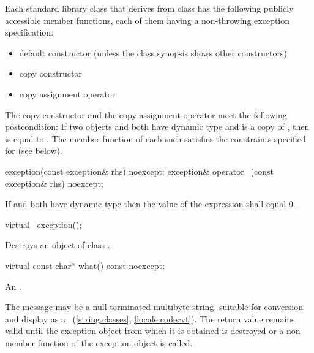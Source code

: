 \pnum
Each standard library class  that derives from class 
has the following publicly accessible member functions, each of them having
a non-throwing exception specification:
\begin{itemize}
\item default constructor (unless the class synopsis shows other constructors)
\item copy constructor
\item copy assignment operator
\end{itemize}
The copy constructor and the copy assignment operator meet
the following postcondition: If two objects  and  both have
dynamic type  and  is a copy of , then
 is equal to .
The  member function of each such  satisfies the
constraints specified for  (see below).

%
%
\begin{itemdecl}
exception(const exception& rhs) noexcept;
exception& operator=(const exception& rhs) noexcept;
\end{itemdecl}

\begin{itemdescr}
\pnum
\ensures If  and  both have dynamic type 
then the value of the expression  shall equal 0.
\end{itemdescr}

%
\begin{itemdecl}
virtual ~exception();
\end{itemdecl}

\begin{itemdescr}
\pnum
\effects
Destroys an object of class
.
\end{itemdescr}

%
\begin{itemdecl}
virtual const char* what() const noexcept;
\end{itemdecl}

\begin{itemdescr}
\pnum
\returns
An  \ntbs{}.

\pnum
\remarks
The message may be a null-terminated multibyte string,
suitable for conversion and display as a
~(\ref{string.classes}, \ref{locale.codecvt}).
The return value remains valid until the exception object from which
it is obtained is destroyed or a non-
member function of the exception object is called.
\end{itemdescr}

